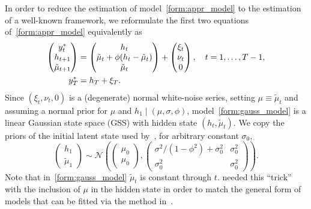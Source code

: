 In order to reduce the estimation of model~\eqref{form:appr_model} to the estimation of a well-known framework, we reformulate the first two equations of~\eqref{form:appr_model} equivalently as
\begin{equation}
\begin{alignedat}{2}\label{form:gauss_model}
\begin{pmatrix}
y_t^\ast \\
h_{t+1} \\
\tilde{\mu}_{t+1}
\end{pmatrix} &=
\begin{pmatrix}
h_t \\
\tilde{\mu}_t+\phi(h_t-\tilde{\mu}_t) \\
\tilde \mu_t
\end{pmatrix} +
\begin{pmatrix}
\xi_t \\
\nu_t \\
0
\end{pmatrix}, \quad t=1,\dots,T-1, \\
y_T^\ast &= h_T+\xi_T.
\end{alignedat}
\end{equation}
Since $(\xi_t,\nu_t,0)$ is a (degenerate) normal white-noise series, setting $\mu\equiv\tilde{\mu}_t$ and assuming a normal prior for $\mu$ and $h_1\mid(\mu,\sigma,\phi)$, model~\eqref{form:gauss_model} is a linear Gaussian state space (GSS) with hidden state $(h_t,\tilde{\mu}_t)$.
We copy the priors of the initial latent state used by~\citeauthor{Omori2007}, for arbitrary constant $\sigma_0$,
\begin{equation*}
\begin{pmatrix}
h_1 \\
\tilde\mu_1
\end{pmatrix} \sim
\mathcal{N}\left(
\begin{pmatrix}
\mu_0 \\
\mu_0
\end{pmatrix},
\begin{pmatrix}
\sigma^2/(1-\phi^2)+\sigma_0^2 & \sigma_0^2 \\
\sigma_0^2 & \sigma_0^2
\end{pmatrix}
\right).
\end{equation*}
Note that in~\eqref{form:gauss_model} $\tilde{\mu}_t$ is constant through $t$. \citeauthor{Omori2007} needed this ``trick'' with the inclusion of $\mu$ in the hidden state in order to match the general form of models that can be fitted via the method in~\citet{de1995simulation}.

